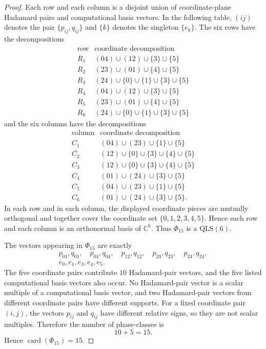\documentclass[a4paper,11pt]{article}
\newcommand{\C}{\mathbb{C}}
\newcommand{\QLS}{\mathrm{QLS}}
\begin{document}
\begin{proof}
Each row and each column is a disjoint union of coordinate-plane Hadamard pairs
and computational basis vectors. In the following table, $(ij)$ denotes the pair
$\{p_{ij},q_{ij}\}$ and $\{k\}$ denotes the singleton $\{e_k\}$.
The six rows have the decompositions
\[
\begin{array}{c|c}
\text{row} & \text{coordinate decomposition} \\\hline
R_1 & (04)\cup(12)\cup\{3\}\cup\{5\}\\
R_2 & (23)\cup(01)\cup\{4\}\cup\{5\}\\
R_3 & (24)\cup\{0\}\cup\{1\}\cup\{3\}\cup\{5\}\\
R_4 & (04)\cup(12)\cup\{3\}\cup\{5\}\\
R_5 & (23)\cup(01)\cup\{4\}\cup\{5\}\\
R_6 & (24)\cup\{0\}\cup\{1\}\cup\{3\}\cup\{5\}
\end{array}
\]
and the six columns have the decompositions
\[
\begin{array}{c|c}
\text{column} & \text{coordinate decomposition} \\\hline
C_1 & (04)\cup(23)\cup\{1\}\cup\{5\}\\
C_2 & (12)\cup\{0\}\cup\{3\}\cup\{4\}\cup\{5\}\\
C_3 & (12)\cup\{0\}\cup\{3\}\cup\{4\}\cup\{5\}\\
C_4 & (01)\cup(24)\cup\{3\}\cup\{5\}\\
C_5 & (04)\cup(23)\cup\{1\}\cup\{5\}\\
C_6 & (01)\cup(24)\cup\{3\}\cup\{5\}.
\end{array}
\]
In each row and in each column, the displayed coordinate pieces are mutually
orthogonal and together cover the coordinate set $\{0,1,2,3,4,5\}$. Hence each
row and each column is an orthonormal basis of $\C^6$. Thus $\Phi_{15}$ is a
$\QLS(6)$.

The vectors appearing in $\Phi_{15}$ are exactly
\[
\begin{gathered}
  p_{01},q_{01},\quad p_{04},q_{04},\quad p_{12},q_{12},\quad
  p_{23},q_{23},\quad p_{24},q_{24},\\
  e_0,e_1,e_3,e_4,e_5.
\end{gathered}
\]
The five coordinate pairs contribute $10$ Hadamard-pair vectors, and the five
listed computational basis vectors also occur. No Hadamard-pair vector is a
scalar multiple of a computational basis vector, and two Hadamard-pair vectors
from different coordinate pairs have different supports. For a fixed coordinate
pair $(i,j)$, the vectors $p_{ij}$ and $q_{ij}$ have different relative signs,
so they are not scalar multiples. Therefore the number of phase-classes is
\[
  10+5=15.
\]
Hence $\operatorname{card}(\Phi_{15})=15$.
\end{proof}
\end{document}
